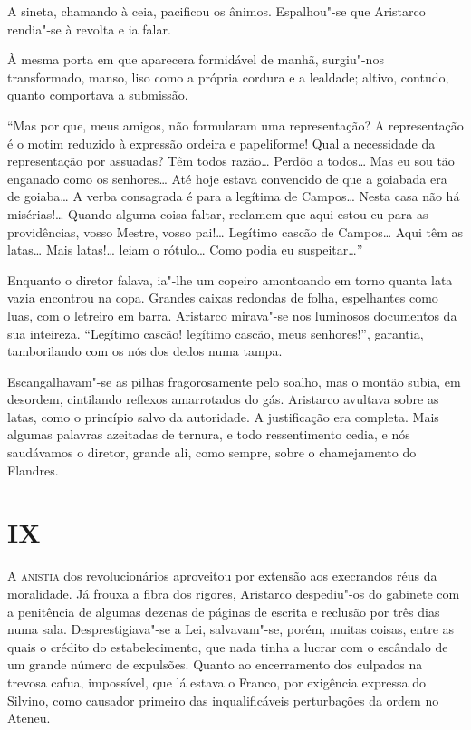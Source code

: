 A sineta, chamando à ceia, pacificou os ânimos. Espalhou"-se que Aristarco
rendia"-se à revolta e ia falar. 

À mesma porta em que aparecera
formidável de manhã, surgiu"-nos transformado, manso, liso como a
própria cordura e a lealdade; altivo, contudo, quanto comportava a
submissão. 

``Mas por que, meus amigos, não formularam uma representação?
A representação é o motim
reduzido à expressão ordeira e papeliforme! Qual a necessidade da
representação por assuadas? Têm todos razão\ldots{} Perdôo a todos\ldots{} Mas
eu sou tão enganado como os senhores\ldots{} Até hoje estava convencido de
que a goiabada era de goiaba\ldots{} A verba consagrada é para a legítima de
Campos\ldots{} Nesta casa não há misérias!\ldots{} Quando alguma coisa faltar,
reclamem que aqui estou eu para as providências, vosso Mestre, vosso
pai!\ldots{} Legítimo cascão de Campos\ldots{} Aqui têm as latas\ldots{} Mais
latas!\ldots{} leiam o rótulo\ldots{} Como podia eu suspeitar\ldots{}'' 

Enquanto o diretor falava, ia"-lhe um copeiro amontoando em torno quanta lata
vazia encontrou na copa. Grandes caixas redondas de folha, espelhantes
como luas, com o letreiro em barra. Aristarco mirava"-se nos luminosos
documentos da sua inteireza. ``Legítimo cascão! legítimo cascão, meus
senhores!'', garantia, tamborilando com os nós dos dedos numa tampa.

Escangalhavam"-se as pilhas fragorosamente pelo soalho, mas o montão
subia, em desordem, cintilando reflexos amarrotados do gás. Aristarco
avultava sobre as latas, como o princípio salvo da autoridade. A
justificação era completa. Mais algumas palavras azeitadas de ternura,
e todo ressentimento cedia, e nós saudávamos o diretor, grande ali,
como sempre, sobre o chamejamento do Flandres.

\section{IX}

\noindent\textsc{A anistia} dos revolucionários aproveitou por extensão aos execrandos
réus da moralidade. Já frouxa a fibra dos rigores, Aristarco
despediu"-os do gabinete com a penitência de algumas dezenas de
páginas de escrita e reclusão por três dias numa sala.
Desprestigiava"-se a Lei, salvavam"-se, porém, muitas coisas, entre
as quais o crédito do estabelecimento, que nada tinha a lucrar com o
escândalo de um grande número de expulsões. Quanto ao encerramento dos
culpados na trevosa cafua, impossível, que lá estava o Franco, por
exigência expressa do Silvino, como causador primeiro das
inqualificáveis perturbações da ordem no Ateneu. 

